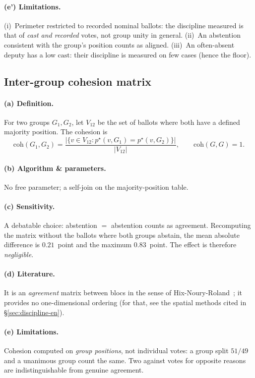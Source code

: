 \paragraph{(e') Limitations.} (i)~Perimeter restricted to recorded nominal
ballots: the \og{}discipline\fg{} measured is that of \emph{cast and recorded}
votes, not group unity in general. (ii)~An abstention consistent with the group's
position counts as \og{}aligned\fg{}. (iii)~An often-absent deputy has a low
$\mathrm{cast}$: their discipline is measured on few cases (hence the floor).

\subsection{Inter-group cohesion matrix}\label{sec:matrice-en}

\paragraph{(a) Definition.} For two groups $G_1,G_2$, let $V_{12}$ be the set of
ballots where both have a defined majority position. The cohesion is
\[
\mathrm{coh}(G_1,G_2)=\frac{\big|\{v\in V_{12}:p^\star(v,G_1)=p^\star(v,G_2)\}\big|}{|V_{12}|},
\qquad \mathrm{coh}(G,G)=1.
\]

\paragraph{(b) Algorithm \& parameters.} No free parameter; a self-join on the
majority-position table.

\paragraph{(c) Sensitivity.} A debatable choice: \og{}abstention $=$ abstention\fg{}
counts as agreement. Recomputing the matrix without the ballots where both groups
abstain, the mean absolute difference is $0.21$~point and the maximum $0.83$~point.
The effect is therefore \emph{negligible}.

\paragraph{(d) Literature.} It is an \emph{agreement} matrix between blocs in the
sense of Hix-Noury-Roland~\cite{hnr2007}; it provides no one-dimensional ordering
(for that, see the spatial methods cited in §\ref{sec:discipline-en}).

\paragraph{(e) Limitations.} Cohesion computed on \emph{group positions}, not
individual votes: a group split $51/49$ and a unanimous group count the same. Two
\og{}against\fg{} votes for opposite reasons are indistinguishable from genuine
agreement.

